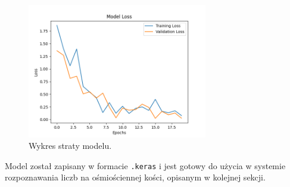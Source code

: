 \begin{figure}[H]
    \centering
    \includegraphics[width=0.7\textwidth]{chapters/04-czytanie/figures/ModelLoss1}
    \caption{Wykres straty modelu.}
    \label{fig:ModelLoss}
\end{figure}

Model został zapisany w formacie \texttt{.keras} i jest gotowy do użycia w systemie rozpoznawania liczb na ośmiościennej kości,
opisanym w kolejnej sekcji.
